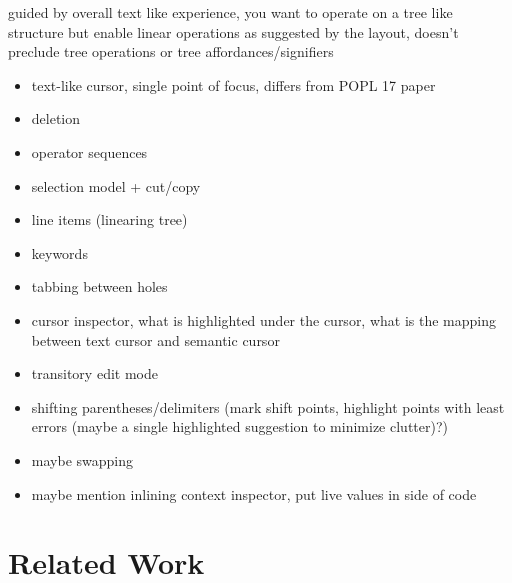 \documentclass[runningheads]{llncs}
\begin{document}
guided by overall text like experience, you want to operate on a tree like structure but enable linear operations as suggested by the layout, doesn't preclude tree operations or tree affordances/signifiers
\begin{itemize}
\item text-like cursor, single point of focus, differs from POPL 17 paper
\item deletion
\item operator sequences
\item selection model + cut/copy
\item line items (linearing tree)
\item keywords
\item tabbing between holes
\item cursor inspector, what is highlighted under the cursor, what is the mapping between text cursor and semantic cursor
\item transitory edit mode
\item shifting parentheses/delimiters (mark shift points, highlight points with least errors (maybe a single highlighted suggestion to minimize clutter)?)
\item maybe swapping
\item maybe mention inlining context inspector, put live values in side of code
\end{itemize}

\section{Related Work} \label{sec:related-work}
\end{document}
